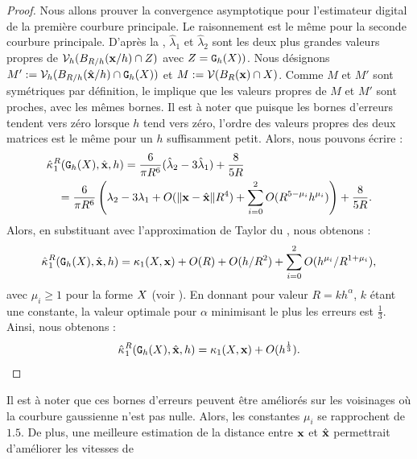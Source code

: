 \begin{proof}
  Nous allons prouver la convergence asymptotique pour l'estimateur digital de la
  première courbure principale. Le raisonnement est le même pour la seconde
  courbure principale. D'après la ,
  $\hat{\lambda}_1$ et $\hat{\lambda}_2$ sont les deux plus grandes valeurs
  propres de $\DCov{h}(\Ball{R/h}{\vx / h} \cap \DigShape)$ avec
  $Z=\DigF{X}{h})$. Nous désignons $M' \EqDef \DCov{h}(\Ball{R/h}{\hat{\vx}/h}
  \cap \DSh)$ et $M \EqDef \Cov(\Ball{R}{\vx} \cap \Shape )$. Comme $M$ et $M'$
  sont symétriques par définition, le  implique que
  les valeurs propres de $M$ et $M'$ sont proches, avec les mêmes bornes. Il est à
  noter que puisque les bornes d'erreurs tendent vers zéro lorsque $h$ tend vers
  zéro, l'ordre des valeurs propres des deux matrices est le même pour un $h$
  suffisamment petit. Alors, nous pouvons écrire :
  \begin{align}
    &\PrincCurvH{1}{R}(\DSh,\hat{\vx},h) = \frac{6}{\pi R^6}(\hat{\lambda}_2 - 3\hat{\lambda}_1) + \frac{8}{5R} \\
    &\quad = \frac{6}{\pi R^6} \left( \lambda_2 - 3\lambda_1 + O(\|\vx-\hat{\vx}\| R^4) + \sum_{i=0}^2 O(R^{5-\mu_i}h^{\mu_i}) \right) + \frac{8}{5R}.
  \end{align}
  Alors, en substituant avec l'approximation de Taylor du
  , nous obtenons :
  \begin{equation} \label{eq:error-term-conv-mean-curv-est}
    \PrincCurvH{1}{R}(\DSh,\hat{\vx},h) = \PrincCurv{1}(\Shape,\vx) + O(R) + O( h/R^2) + \sum_{i=0}^2 O(h^{\mu_i}/R^{1+\mu_i}) ,
  \end{equation}
  avec $\mu_i \ge 1$ pour la forme $\Shape$ (voir
  ). En donnant pour valeur $R =
  kh^\alpha$, $k$ étant une constante, la valeur optimale pour $\alpha$
  minimisant le plus les erreurs est $\frac{1}{3}$. Ainsi, nous obtenons :
  \begin{equation}
    \PrincCurvH{1}{R}(\DSh,\hat{\vx},h) = \PrincCurv{1}(\Shape,\vx) + O(h^{\frac{1}{3}}).
  \end{equation}
\end{proof}
%
Il est à noter que ces bornes d'erreurs peuvent être améliorés sur les
voisinages où la courbure gaussienne n'est pas nulle. Alors, les constantes
$\mu_i$ se rapprochent de $1.5$. De plus, une meilleure estimation de la
distance entre $\vx$ et $\hat{\vx}$ permettrait d'améliorer les vitesses de
